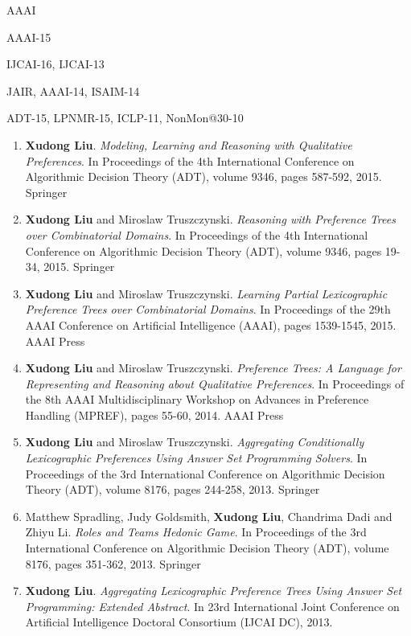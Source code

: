 	\begin{description} \itemsep -3pt
		\item[Student member:] {AAAI}
		\item[Student volunteer:] {AAAI-15}
		\item[Program committee:] {IJCAI-16, IJCAI-13}
		\item[Paper reviewer:] {JAIR, AAAI-14, ISAIM-14}
		\item[Local arrangement committee:] {ADT-15, LPNMR-15, ICLP-11, NonMon@30-10}
	\end{description} %
\vspace{3pt}



\begin{enumerate}  \itemsep -3pt
	\item \textbf{Xudong Liu}.
		\textit{Modeling, Learning and Reasoning with Qualitative Preferences}.
		In Proceedings of the 4th International Conference on Algorithmic Decision Theory (ADT),
		volume 9346, pages 587-592, 2015. Springer
	\item \textbf{Xudong Liu} and Miroslaw Truszczynski.
		\textit{Reasoning with Preference Trees over Combinatorial Domains}.
		In Proceedings of the 4th International Conference on Algorithmic Decision Theory (ADT),
		volume 9346, pages 19-34, 2015. Springer
	\item \textbf{Xudong Liu} and Miroslaw Truszczynski.
		\textit{Learning Partial Lexicographic Preference Trees over Combinatorial Domains}.
		In Proceedings of the 29th AAAI Conference on Artificial Intelligence (AAAI),
		pages 1539-1545, 2015. AAAI Press
	\item \textbf{Xudong Liu} and Miroslaw Truszczynski.
		\textit{Preference Trees: A Language for Representing and Reasoning about Qualitative Preferences}.
		In Proceedings of the 8th AAAI Multidisciplinary Workshop on Advances in Preference 
		Handling (MPREF), pages 55-60, 2014. AAAI Press
	\item \textbf{Xudong Liu} and Miroslaw Truszczynski.
		\textit{Aggregating Conditionally Lexicographic Preferences Using Answer Set Programming Solvers}.
		In Proceedings of the 3rd International Conference on Algorithmic Decision Theory (ADT),
		volume 8176, pages 244-258, 2013. Springer
	\item Matthew Spradling, Judy Goldsmith, {\bf Xudong Liu}, Chandrima Dadi and Zhiyu Li.
		\textit{Roles and Teams Hedonic Game}.
		In Proceedings of the 3rd International Conference on Algorithmic Decision Theory (ADT), 
		volume 8176, pages 351-362, 2013. Springer
	\item {\bf Xudong Liu}. \textit{Aggregating Lexicographic Preference Trees Using Answer Set Programming: Extended Abstract}. 
In 23rd International Joint Conference on Artificial Intelligence Doctoral Consortium (IJCAI DC), 2013.
\end{enumerate}


